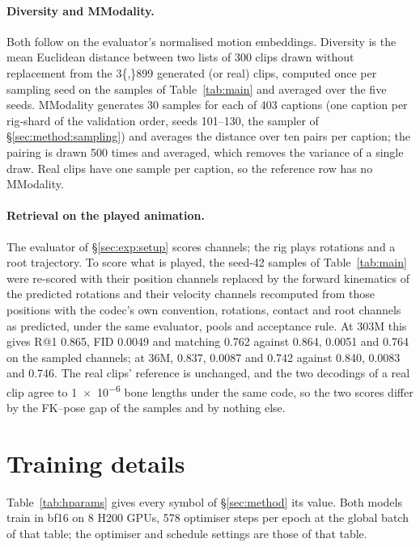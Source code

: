 \paragraph{Diversity and MModality.} Both follow \citet{guo2022generating} on the evaluator's normalised motion
embeddings. Diversity is the mean Euclidean distance between two lists of 300 clips drawn without replacement from
the \num{3{,}899} generated (or real) clips, computed once per sampling seed on the samples of Table~\ref{tab:main}
and averaged over the five seeds. MModality generates 30 samples for each of \num{403} captions (one caption per
rig-shard of the validation order, seeds 101--130, the sampler of \S\ref{sec:method:sampling}) and averages the
distance over ten pairs per caption; the pairing is drawn 500 times and averaged, which removes the variance of a
single draw. Real clips have one sample per caption, so the reference row has no MModality.

\paragraph{Retrieval on the played animation.} The evaluator of \S\ref{sec:exp:setup} scores \rep{} channels; the
rig plays rotations and a root trajectory. To score what is played, the seed-42 samples of Table~\ref{tab:main}
were re-scored with their position channels replaced by the forward kinematics of the predicted rotations and
their velocity channels recomputed from those positions with the codec's own convention, rotations, contact and
root channels as predicted, under the same evaluator, pools and acceptance rule. At \num{303}M this gives R@1
\num{0.865}, FID \num{0.0049} and matching \num{0.762} against \num{0.864}, \num{0.0051} and \num{0.764} on the
sampled channels; at \num{36}M, \num{0.837}, \num{0.0087} and \num{0.742} against \num{0.840}, \num{0.0083} and
\num{0.746}. The real clips' reference is unchanged, and the two decodings of a real clip agree to \num{1e-6} bone
lengths under the same code, so the two scores differ by the FK--pose gap of the samples and by nothing else.

\section{Training details}\label{app:training}

Table~\ref{tab:hparams} gives every symbol of \S\ref{sec:method} its value. Both models train in bf16 on 8 H200
GPUs, \num{578} optimiser steps per epoch at the global batch of that table; the optimiser and schedule settings
are those of that table.

